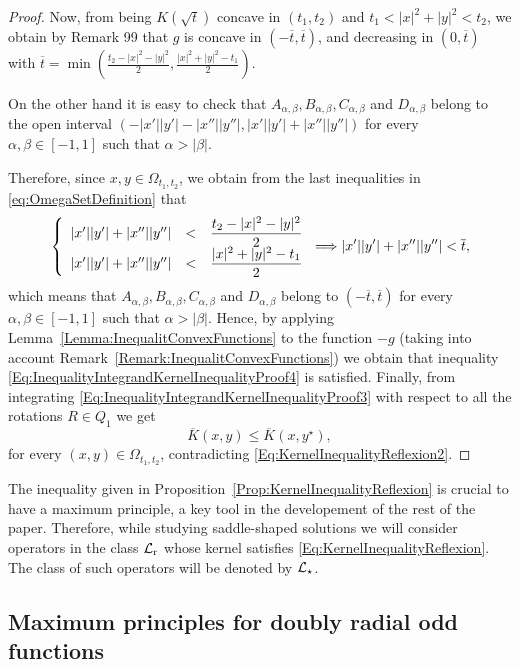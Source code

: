 \begin{proof}
Now, from being $K(\sqrt{t})$ concave in $(t_1,t_2)$ and $t_1<|x|^2+|y|^2<t_2$, we obtain by Remark
99 that $g$ is concave in $ \left( -\overline{t}, \overline{t}\right) $, and decreasing in
$(0,\overline{t})$ with $\overline{t} =
\min{\left(\frac{t_2-|x|^2-|y|^2}{2},\frac{|x|^2+|y|^2-t_1}{2}\right)}$.

On the other hand it is easy to check that $A_{\alpha,\beta}, B_{\alpha,\beta}, C_{\alpha,\beta}$
and $D_{\alpha,\beta}$ belong to the open interval $(-|x'||y'|-|x''||y''|,|x'||y'|+|x''||y''|)$ for
every $\alpha, \beta \in [-1,1]$ such that $\alpha>|\beta|$.

Therefore, since $x,y \in \Omega_{t_1,t_2}$, we obtain from the last inequalities in
\eqref{eq:OmegaSetDefinition} that
$$
\left\{\begin{array}{rcll}
|x'||y'|+|x''||y''|&<&\dfrac{t_2-|x|^2-|y|^2}{2}\\
|x'||y'|+|x''||y''|&<&\dfrac{|x|^2+|y|^2-t_1}{2}
\end{array} \right. \Longrightarrow  |x'||y'|+|x''||y''|<\overline{t},
$$
which means that $A_{\alpha,\beta}, B_{\alpha,\beta}, C_{\alpha,\beta}$ and $D_{\alpha,\beta}$
belong to $(-\overline{t},\overline{t})$ for every $\alpha, \beta \in [-1,1]$ such that
$\alpha>|\beta|$. Hence, by applying Lemma~\ref{Lemma:InequalitConvexFunctions} to the function
$-g$ (taking into account Remark~\ref{Remark:InequalitConvexFunctions}) we obtain that inequality
\eqref{Eq:InequalityIntegrandKernelInequalityProof4} is satisfied. Finally, from integrating
\eqref{Eq:InequalityIntegrandKernelInequalityProof3} with respect to all the rotations $R\in Q_1$
we get
$$ \overline{K}(x,y) \leq \overline{K}(x, y^\star),$$
for every $(x,y)\in \Omega_{t_1,t_2}$, contradicting \eqref{Eq:KernelInequalityReflexion2}.
\end{proof}

The inequality given in Proposition~\ref{Prop:KernelInequalityReflexion} is crucial to have a maximum principle, a key tool in the developement of the rest of the paper. Therefore, while studying saddle-shaped solutions we will consider operators in the class $\mathcal{L}_{\mathrm{r}}$ whose kernel satisfies \eqref{Eq:KernelInequalityReflexion}. The class of such operators will be denoted by $\mathcal{L}_\star$.


\subsection{Maximum principles for doubly radial odd functions}

